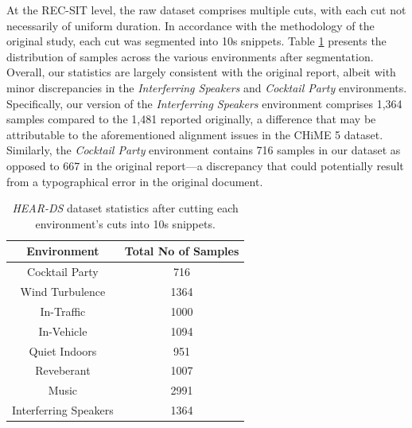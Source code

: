 \documentclass[logo,bsc,singlespacing,parskip,online]{infthesis}
\newcommand{\heards}{\textit{HEAR-DS}\xspace}
\begin{document}
At the REC-SIT level, the raw dataset comprises multiple cuts, with each cut not necessarily of uniform duration.
In accordance with the methodology of the original study, each cut was segmented into 10s snippets.
Table \ref{tab:hear-ds-stats} presents the distribution of samples across the various environments after segmentation.
Overall, our statistics are largely consistent with the original report, albeit with minor discrepancies in the \textit{Interferring Speakers} and \textit{Cocktail Party} environments.
Specifically, our version of the \textit{Interferring Speakers} environment comprises 1,364 samples compared to the 1,481 reported originally, a difference that may be attributable to the aforementioned alignment issues in the CHiME 5 dataset.
Similarly, the \textit{Cocktail Party} environment contains 716 samples in our dataset as opposed to 667 in the original report—a discrepancy that could potentially result from a typographical error in the original document. 

\begin{table}[h]
   \centering
   \begin{tabular}{|c|c|}
      \hline
      Environment & Total No of Samples \\
      \hline
      Cocktail Party & 716 \\
      Wind Turbulence & 1364 \\
      In-Traffic & 1000 \\ 
      In-Vehicle & 1094 \\
      Quiet Indoors & 951 \\ 
      Reveberant & 1007 \\ 
      Music & 2991 \\
      Interferring Speakers & 1364 \\
      \hline
   \end{tabular}
   \caption{\heards dataset statistics after cutting each environment's cuts into 10s snippets.}
   \label{tab:hear-ds-stats}
\end{table}
\end{document}
